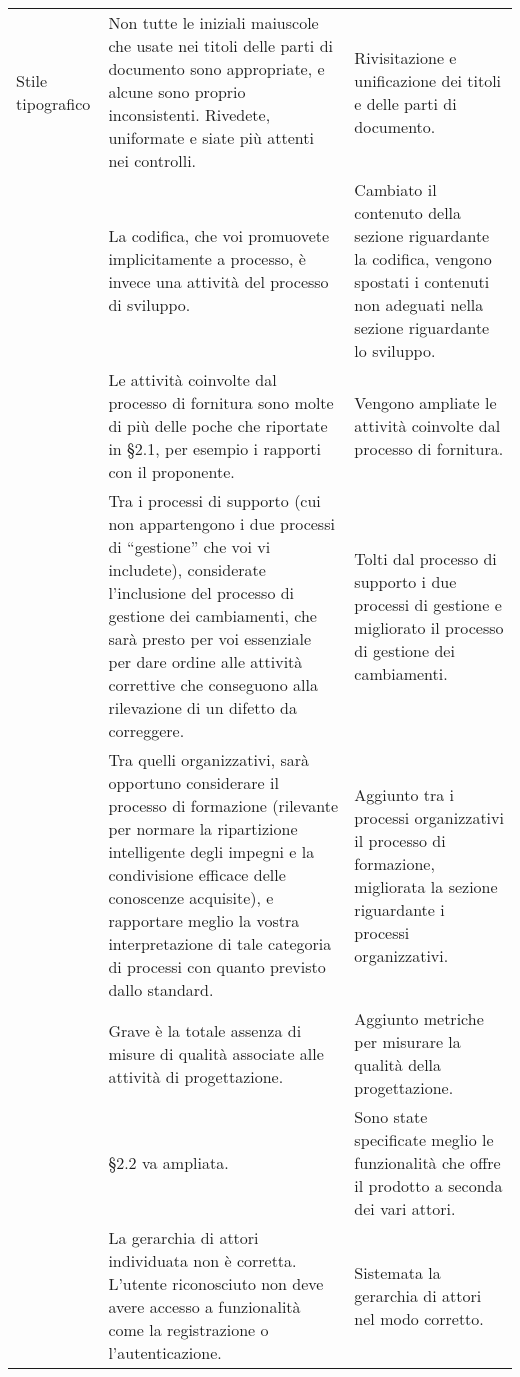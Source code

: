 {\begin{longtable}{ C{2cm} C{6cm} C{6cm}}
		Stile tipografico & Non tutte le iniziali maiuscole che usate nei titoli delle parti di documento sono appropriate, e alcune sono proprio inconsistenti. Rivedete, uniformate e siate più attenti nei controlli. & Rivisitazione e unificazione dei titoli e delle parti di documento. \\
		
		\NdP & La codifica, che voi promuovete implicitamente a processo, è invece una attività del processo di sviluppo. & Cambiato il contenuto della sezione riguardante la codifica, vengono spostati i contenuti non adeguati nella sezione riguardante lo sviluppo.\\
		
		\NdP & Le attività coinvolte dal processo di fornitura sono molte di più delle
		poche che riportate in §2.1, per esempio i rapporti con il proponente.& Vengono ampliate le attività coinvolte dal processo di fornitura.\\
		
		\NdP & Tra i processi di supporto (cui non appartengono i due processi di “gestione” che voi vi includete), considerate l’inclusione del processo di gestione dei cambiamenti, che sarà presto per voi essenziale per dare ordine alle attività correttive che conseguono alla rilevazione di un difetto da correggere.& Tolti dal processo di supporto i due processi di gestione e migliorato il processo di gestione dei cambiamenti. \\ 
		
		\NdP & Tra quelli organizzativi, sarà opportuno considerare il processo di formazione (rilevante per normare la ripartizione intelligente degli impegni e la condivisione efficace delle conoscenze acquisite), e rapportare meglio la vostra interpretazione di tale categoria di processi con quanto previsto dallo standard. & Aggiunto tra i processi organizzativi il processo di formazione, migliorata la sezione riguardante i processi organizzativi.\\
		
		\NdP & Grave è la totale assenza di misure di qualità associate alle attività di progettazione. & Aggiunto metriche per misurare la qualità della progettazione.\\
		
		\AdR & §2.2 va ampliata. & Sono state specificate meglio le funzionalità che offre il prodotto a seconda dei vari attori. \\
		
		\AdR & La gerarchia di attori individuata non è corretta. L’utente
		riconosciuto non deve avere accesso a funzionalità come la registrazione o
		l’autenticazione. & Sistemata la gerarchia di attori nel modo corretto.\\
		

\end{longtable}}
